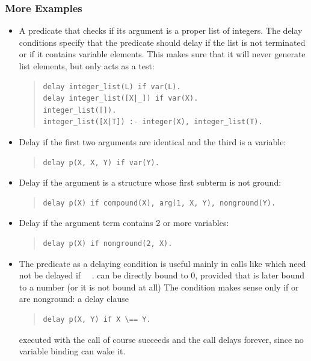 \subsubsection{More Examples}
\begin{itemize}
\item
A predicate that checks if its argument is a proper list of integers.
The delay conditions specify that the predicate should delay if the list
is not terminated or if it contains variable elements.
This makes sure that it will never generate list elements, but only
acts as a test:
\begin{quote}
\begin{verbatim}
delay integer_list(L) if var(L).
delay integer_list([X|_]) if var(X).
integer_list([]).
integer_list([X|T]) :- integer(X), integer_list(T).
\end{verbatim}
\end{quote}

\item
Delay if the first two arguments are identical and the third is a variable:
\begin{quote}
\begin{verbatim}
delay p(X, X, Y) if var(Y).
\end{verbatim}
\end{quote}

\item
Delay if the argument is a structure whose first subterm is not ground:
\begin{quote}
\begin{verbatim}
delay p(X) if compound(X), arg(1, X, Y), nonground(Y).
\end{verbatim}
\end{quote}

\item
Delay if the argument term contains 2 or more variables:
\begin{quote}
\begin{verbatim}
delay p(X) if nonground(2, X).
\end{verbatim}
\end{quote}

\item
The
predicate as a delaying condition is useful mainly
in calls like  which need not be delayed if
~\notation{==}~.
 can be directly bound to 0, provided that  is later bound to
a number
(or it is not bound at all)
The condition  makes sense
only if  or  are nonground: a delay clause
\begin{quote}
\begin{verbatim}
delay p(X, Y) if X \== Y.
\end{verbatim}
\end{quote}
executed with the call  of course succeeds and the call
delays
forever, since no variable binding can wake it.
\end{itemize}

